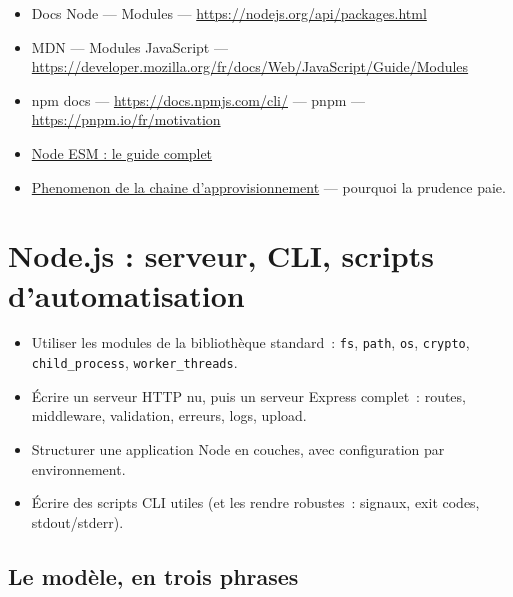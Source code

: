 \documentclass[12pt,a4paper,twoside,openright]{book}
\newcommand{\link}[2]{\href{#2}{#1}}
\begin{document}
\begin{ressources}
\begin{itemize}
  \item Docs Node --- Modules --- \url{https://nodejs.org/api/packages.html}
  \item MDN --- Modules JavaScript --- \url{https://developer.mozilla.org/fr/docs/Web/JavaScript/Guide/Modules}
  \item npm docs --- \url{https://docs.npmjs.com/cli/} --- pnpm --- \url{https://pnpm.io/fr/motivation}
  \item \link{Node ESM : le guide complet}{https://gist.github.com/sindresorhus/a39789f98801d908bbc7ff3ecc99d99c}
  \item \link{Phenomenon de la chaine d'approvisionnement}{https://en.wikipedia.org/wiki/Supply\_chain\_attack} --- pourquoi la prudence paie.
\end{itemize}
\end{ressources}

\chapter{Node.js : serveur, CLI, scripts d'automatisation}
\label{ch-node}

\begin{objectif}
\begin{itemize}
  \item Utiliser les modules de la biblioth\`eque standard~: \texttt{fs}, \texttt{path}, \texttt{os},
        \texttt{crypto}, \texttt{child\_process}, \texttt{worker\_threads}.
  \item \'Ecrire un serveur HTTP nu, puis un serveur Express complet~: routes, middleware,
        validation, erreurs, logs, upload.
  \item Structurer une application Node en couches, avec configuration par environnement.
  \item \'Ecrire des scripts CLI utiles (et les rendre robustes~: signaux, exit codes, stdout/stderr).
\end{itemize}
\end{objectif}

\section{Le mod\`ele, en trois phrases}
\end{document}
